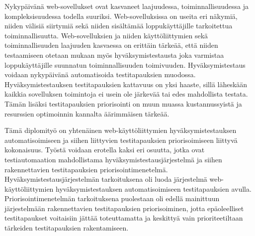 Nykypäivänä web-sovellukset ovat kasvaneet laajuudessa, toiminnallisuudessa ja kompleksisuudessa todella suuriksi.
Web-sovelluksissa on useita eri näkymiä, niiden välisiä siirtymiä sekä niiden sisältämää loppukäyttäjille tarkoitettua toiminnallisuutta.
Web-sovelluksien ja niiden käyttöliittymien sekä toiminnallisuuden laajuuden kasvaessa on erittäin tärkeää, että niiden testaamiseen otetaan mukaan myös hyväksymistestausta joka varmistaa loppukäyttäjille suunnatun toiminnallisuuden toimivuuden.
Hyväksymistestaus voidaan nykypäivänä automatisoida testitapauksien muodossa.
Hyväksymistestauksen testitapauksien kattavuus on yksi haaste, sillä läheskään kaikkia sovelluksen toimintoja ei usein ole järkevää tai edes mahdollista testata.
Tämän lisäksi testitapauksien priorisointi on muun muassa kustannussyistä ja resurssien optimoinnin kannalta äärimmäisen tärkeää.

Tämä diplomityö on yhtenäinen web-käyttöliittymien hyväksymistestauksen automatisoimiseen ja siihen liittyvien testitapauksien priorisoimiseen liittyvä kokonaisuus.
Työstä voidaan erotella kaksi eri osuutta, jotka ovat testiautomaation mahdollistama hyväksymistestausjärjestelmä ja siihen rakennettavien testitapauksien priorisointimenetelmä.
Hyväksymistestausjärjestelmän tarkoituksena oli luoda järjestelmä web-käyttöliittymien hyväksymistestauksen automatisoimiseen testitapauksien avulla.
Priorisointimenetelmän tarkoituksena puolestaan oli edellä mainittuun järjestelmään rakennettavien testitapauksien priorisoiminen, jotta epäoleelliset testitapaukset voitaisiin jättää toteuttamatta ja keskittyä vain prioriteetiltaan tärkeiden testitapauksien rakentamiseen.

